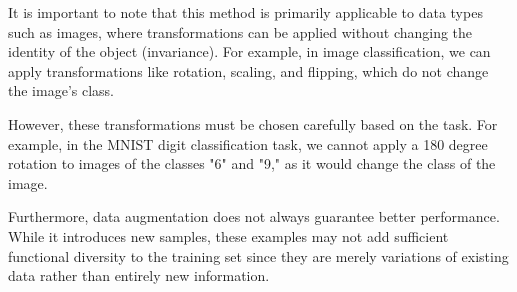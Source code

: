 It is important to note that this method is primarily applicable to data types such as images, where transformations can 
be applied without changing the identity of the object (invariance). 
For example, in image classification, we can apply transformations like rotation, scaling, and flipping, which do not change the image's class.

However, these transformations must be chosen carefully based on the task. For example, in the MNIST digit classification task, we cannot apply a 180 degree rotation to 
images of the classes "6" and "9," as it would change the class of the image.

Furthermore, data augmentation does not always guarantee better performance. While it introduces new samples, 
these examples may not add sufficient functional diversity to the training set since they are 
merely variations of existing data rather than entirely new information.

